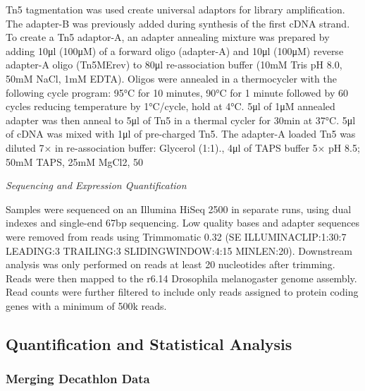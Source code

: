 \documentclass[12pt,letterpaper]{article}
\begin{document}
Tn5 tagmentation was used create universal adaptors for library amplification. The adapter-B was previously added during synthesis of the first cDNA strand. To create a Tn5 adaptor-A, an adapter annealing mixture was prepared by adding 10μl (100μM) of a forward oligo (adapter-A) and 10μl (100μM) reverse adapter-A oligo (Tn5MErev) to 80μl re-association buffer (10mM Tris pH 8.0, 50mM NaCl, 1mM EDTA). Oligos were annealed in a thermocycler with the following cycle program: 95°C for 10 minutes, 90°C for 1 minute followed by 60 cycles reducing temperature by 1°C/cycle, hold at 4°C. 5μl of 1μM annealed adapter was then anneal to 5μl of Tn5 in a thermal cycler for 30min at 37°C. 5μl of cDNA was mixed with 1μl of pre-charged Tn5. The adapter-A loaded Tn5 was diluted 7× in re-association buffer: Glycerol (1:1)., 4μl of TAPS buffer 5× pH 8.5; 50mM TAPS, 25mM MgCl2, 50%

\textit{Sequencing and Expression Quantification}

Samples were sequenced on an Illumina HiSeq 2500 in separate runs, using dual indexes and single-end 67bp sequencing. Low quality bases and adapter sequences were removed from reads using Trimmomatic 0.32 (SE ILLUMINACLIP:1:30:7 LEADING:3 TRAILING:3 SLIDINGWINDOW:4:15 MINLEN:20). Downstream analysis was only performed on reads at least 20 nucleotides after trimming. Reads were then mapped to the r6.14 Drosophila melanogaster genome assembly. Read counts were further filtered to include only reads assigned to protein coding genes with a minimum of 500k reads.

\subsection{Quantification and Statistical Analysis}

\subsubsection{Merging Decathlon Data}
\end{document}
